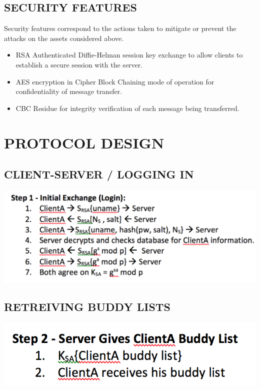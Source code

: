 \documentclass[twoside,letterpaper]{article}
\begin{document}
\bigskip
 
\subsection{SECURITY FEATURES}
Security features correspond to the actions taken to mitigate or prevent the attacks
on the assets considered above.

\begin{itemize}
\item RSA Authenticated Diffie-Helman session key exchange to allow clients to establish a secure session with the server.
\item AES encryption in Cipher Block Chaining mode of operation for confidentiality of message transfer.
\item CBC Residue for integrity verification of each message being transferred.
\end{itemize} 

\bigskip 

\section{PROTOCOL DESIGN}

\bigskip

\subsection{CLIENT-SERVER / LOGGING IN}
\begin{flushleft}
\includegraphics[scale=0.5]{login}
\end{flushleft}
 
\bigskip
 
\subsection{RETREIVING BUDDY LISTS}
\begin{flushleft}
\includegraphics[scale=0.5]{buddies}
\end{flushleft}
 
\end{document}
